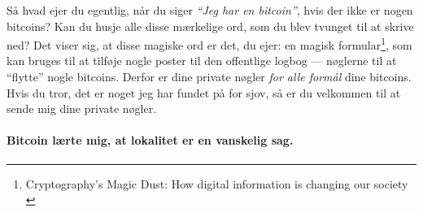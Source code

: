 Så hvad ejer du egentlig, når du siger \textit{\enquote{Jeg har en bitcoin}}, 
hvis der ikke er nogen bitcoins? Kan du husje alle disse mærkelige ord, som du
blev tvunget til at skrive ned? Det viser sig, at disse 
magiske ord er det, du ejer: en magisk formular\footnote{Cryptography's Magic 
Dust: How digital information is changing our society \cite{gigi:magic-spell}}, 
som kan bruges til at tilføje nogle poster til den offentlige logbog --- 
nøglerne til at \enquote{flytte} nogle bitcoins. Derfor er dine private nøgler 
\textit{for alle formål} dine bitcoins. Hvis du tror, det er noget jeg har 
fundet på for sjov, så er du velkommen til at sende mig dine private nøgler.

\paragraph{Bitcoin lærte mig, at lokalitet er en vanskelig sag.}

%
%
%
%
%
%
%
